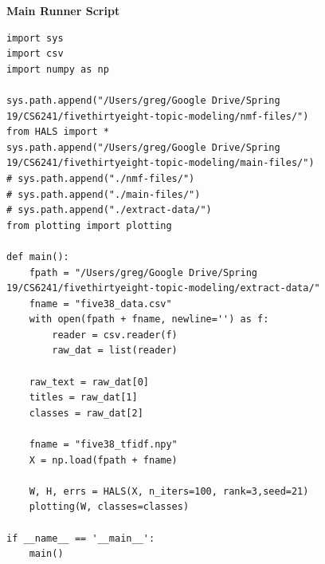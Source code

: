 \documentclass[12pt]{article}
\begin{document}
\textbf{Main Runner Script}
\begin{lstlisting}
import sys
import csv
import numpy as np

sys.path.append("/Users/greg/Google Drive/Spring 19/CS6241/fivethirtyeight-topic-modeling/nmf-files/")
from HALS import *
sys.path.append("/Users/greg/Google Drive/Spring 19/CS6241/fivethirtyeight-topic-modeling/main-files/")
# sys.path.append("./nmf-files/")
# sys.path.append("./main-files/")
# sys.path.append("./extract-data/")
from plotting import plotting

def main():
    fpath = "/Users/greg/Google Drive/Spring 19/CS6241/fivethirtyeight-topic-modeling/extract-data/"
    fname = "five38_data.csv"
    with open(fpath + fname, newline='') as f:
        reader = csv.reader(f)
        raw_dat = list(reader)

    raw_text = raw_dat[0]
    titles = raw_dat[1]
    classes = raw_dat[2]

    fname = "five38_tfidf.npy"
    X = np.load(fpath + fname)

    W, H, errs = HALS(X, n_iters=100, rank=3,seed=21)
    plotting(W, classes=classes)

if __name__ == '__main__':
    main()
\end{lstlisting}
\newpage
\nocite{*}


\end{document}
